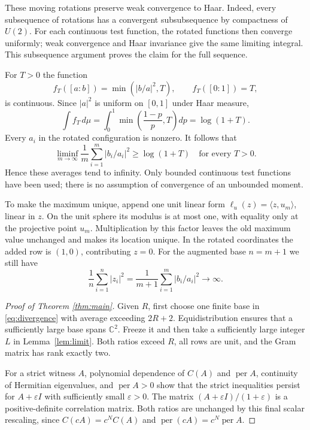 \documentclass[11pt]{article}
\DeclareMathOperator{\per}{per}
\begin{document}
These moving rotations preserve weak convergence to Haar. Indeed, every
subsequence of rotations has a convergent subsubsequence by compactness of
$U(2)$. For each continuous test function, the rotated functions then converge
uniformly; weak convergence and Haar invariance give the same limiting integral.
This subsequence argument proves the claim for the full sequence.

For $T>0$ the function
\[
 f_T([a:b])=\min(|b/a|^2,T),\qquad f_T([0:1])=T,
\]
is continuous. Since $|a|^2$ is uniform on $[0,1]$ under Haar measure,
\begin{equation}\label{eq:truncation}
 \int f_T\,d\mu=\int_0^1\min\left(\frac{1-p}{p},T\right)dp
 =\log(1+T).
\end{equation}
Every $a_i$ in the rotated configuration is nonzero. It follows that
\[
 \liminf_{m\to\infty}\frac1m\sum_{i=1}^m|b_i/a_i|^2\ge\log(1+T)
 \quad\text{for every }T>0.
\]
Hence these averages tend to infinity. Only bounded continuous test functions
have been used; there is no assumption of convergence of an unbounded moment.

To make the maximum unique, append one unit linear form $\ell_u(z)=\langle z,u_m\rangle$,
linear in $z$. On the unit sphere its modulus is at most one, with equality
only at the projective point $u_m$. Multiplication by this factor leaves the
old maximum value unchanged and makes its location unique. In the rotated
coordinates the added row is $(1,0)$, contributing $z=0$. For the augmented
base $n=m+1$ we still have
\begin{equation}\label{eq:divergence}
 \frac1n\sum_{i=1}^n|z_i|^2
 =\frac1{m+1}\sum_{i=1}^m|b_i/a_i|^2\longrightarrow\infty.
\end{equation}

\begin{proof}[Proof of Theorem \ref{thm:main}]
Given $R$, first choose one finite base in \eqref{eq:divergence} with average
exceeding $2R+2$. Equidistribution ensures that a sufficiently large base spans
$\mathbb C^2$. Freeze it and then take a sufficiently large integer $L$ in
Lemma~\ref{lem:limit}. Both ratios exceed $R$, all rows are unit, and the Gram
matrix has rank exactly two.

For a strict witness $A$, polynomial dependence of $C(A)$ and $\per A$, continuity
of Hermitian eigenvalues, and $\per A>0$ show that the strict inequalities persist
for $A+\varepsilon I$ with sufficiently small $\varepsilon>0$. The matrix
$(A+\varepsilon I)/(1+\varepsilon)$ is a positive-definite correlation matrix.
Both ratios are unchanged by this final scalar rescaling, since
$C(cA)=c^N C(A)$ and $\per(cA)=c^N\per A$.
\end{proof}
\end{document}
